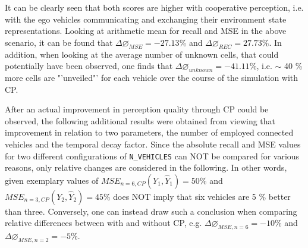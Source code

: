 It can be clearly seen that both scores are higher with cooperative perception, i.e. with the ego vehicles communicating and exchanging their environment state representations. Looking at arithmetic mean for recall and MSE in the above scenario, it can be found that $\Delta \diameter_{MSE} = -27.13 \%$ and $\Delta \diameter_{REC} = 27.73 \%$. In addition, when looking at the average number of unknown cells, that could potentially have been observed, one finds that $\Delta \diameter_{unknown} = -41.11 \%$, i.e. $\sim$ 40 \% more cells are "'unveiled"' for each vehicle over the course of the simulation with CP.
\par
\bigskip

After an actual improvement in perception quality through CP could be observed, the following additional results were obtained from viewing that improvement in relation to two parameters, the number of employed connected vehicles and the temporal decay factor. Since the absolute recall and MSE values for two different configurations of \texttt{N\_VEHICLES} can NOT be compared for various reasons, only relative changes are considered in the following. In other words, given exemplary values of $\textit{MSE}_{n=6, CP}(Y_1, \hat{Y}_1) = 50 \%$ and $\textit{MSE}_{n=3, CP}(Y_2, \hat{Y}_2) = 45 \%$ does NOT imply that six vehicles are 5 \% better than three. Conversely, one can instead draw such a conclusion when comparing relative differences between with and without CP, e.g. $\Delta \diameter_{MSE,n=6} = -10 \%$ and $\Delta \diameter_{MSE,n=2} = -5 \%$.

